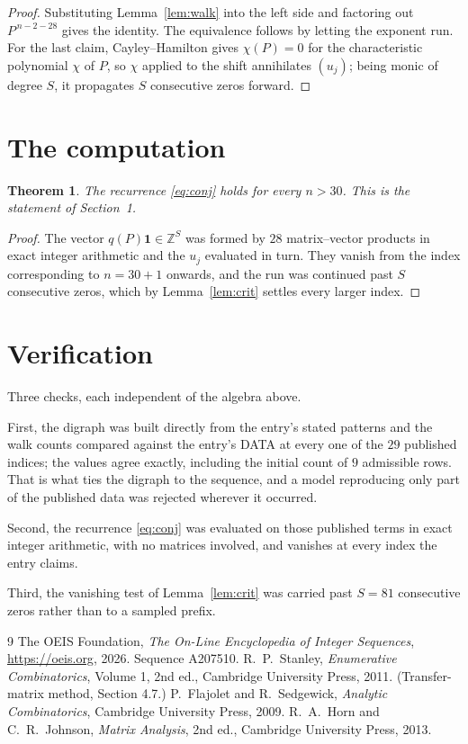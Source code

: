 \documentclass[11pt,a4paper]{article}
\theoremstyle{plain}
\newtheorem{theorem}{Theorem}
\theoremstyle{definition}
\begin{document}
\begin{proof}
Substituting Lemma~\ref{lem:walk} into the left side and factoring out
$P^{\,n-2-28}$ gives the identity. The equivalence follows by letting the exponent
run. For the last claim, Cayley--Hamilton gives $\chi(P)=0$ for the characteristic
polynomial $\chi$ of $P$, so $\chi$ applied to the shift annihilates $(u_j)$; being monic of
degree $S$, it propagates $S$ consecutive zeros forward.
\end{proof}

\section{The computation}

\begin{theorem}
The recurrence \eqref{eq:conj} holds for every $n>30$. This is the statement of
Section~1.
\end{theorem}

\begin{proof}
The vector $q(P)\mathbf{1}\in\mathbb{Z}^{S}$ was formed by $28$ matrix--vector
products in exact integer arithmetic and the $u_j$ evaluated in turn. They vanish from the
index corresponding to $n=30+1$ onwards, and the run was continued past $S$ consecutive
zeros, which by Lemma~\ref{lem:crit} settles every larger index.
\end{proof}

\section{Verification}

Three checks, each independent of the algebra above.

First, the digraph was built directly from the entry's stated patterns and the walk counts
compared against the entry's DATA at every one of the $29$ published indices; the
values agree exactly, including the initial count of $9$ admissible rows. That is
what ties the digraph to the sequence, and a model reproducing only part of the published
data was rejected wherever it occurred.

Second, the recurrence \eqref{eq:conj} was evaluated on those published terms in exact
integer arithmetic, with no matrices involved, and vanishes at every index the entry claims.

Third, the vanishing test of Lemma~\ref{lem:crit} was carried past $S=81$ consecutive
zeros rather than to a sampled prefix.

\begin{thebibliography}{9}
 The OEIS Foundation, \emph{The On-Line Encyclopedia of Integer
Sequences}, \url{https://oeis.org}, 2026. Sequence A207510.
 R.~P.~Stanley, \emph{Enumerative Combinatorics}, Volume 1, 2nd ed.,
Cambridge University Press, 2011. (Transfer-matrix method, Section 4.7.)
 P.~Flajolet and R.~Sedgewick, \emph{Analytic Combinatorics}, Cambridge
University Press, 2009.
 R.~A.~Horn and C.~R.~Johnson, \emph{Matrix Analysis}, 2nd ed., Cambridge
University Press, 2013.
\end{thebibliography}
\end{document}
